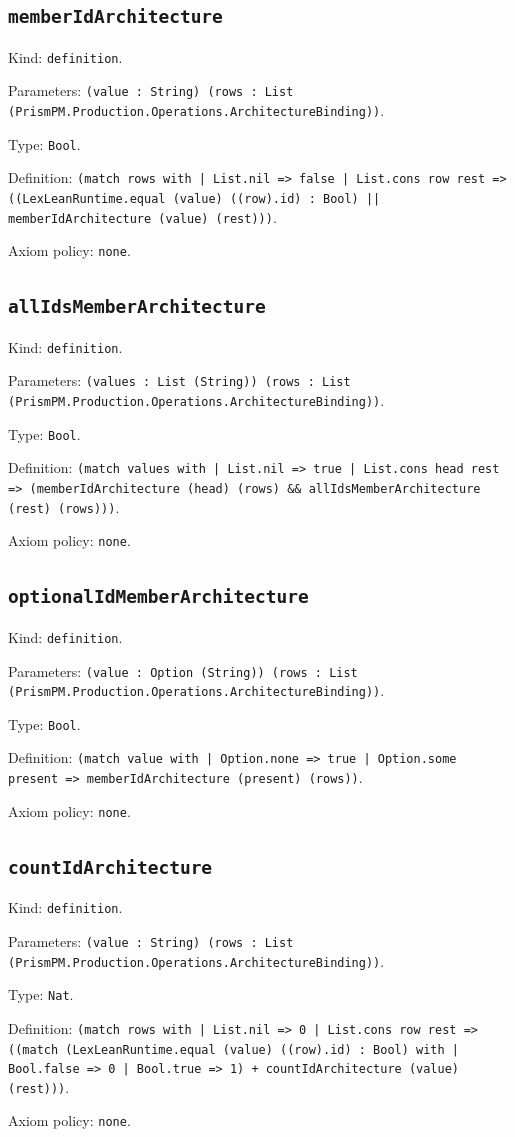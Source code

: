 \documentclass[11pt]{article}
\begin{document}
\subsection*{\texttt{memberIdArchitecture}}
\noindent Kind: \texttt{definition}.\par
\noindent Parameters: \texttt{(value : String) (rows : List (PrismPM.Production.Operations.ArchitectureBinding))}.\par
\noindent Type: \texttt{Bool}.\par
\noindent Definition: \texttt{(match rows with | List.nil => false | List.cons row rest => ((LexLeanRuntime.equal (value) ((row).id) : Bool) || memberIdArchitecture (value) (rest)))}.\par
\noindent Axiom policy: \texttt{none}.\par
\subsection*{\texttt{allIdsMemberArchitecture}}
\noindent Kind: \texttt{definition}.\par
\noindent Parameters: \texttt{(values : List (String)) (rows : List (PrismPM.Production.Operations.ArchitectureBinding))}.\par
\noindent Type: \texttt{Bool}.\par
\noindent Definition: \texttt{(match values with | List.nil => true | List.cons head rest => (memberIdArchitecture (head) (rows) \&\& allIdsMemberArchitecture (rest) (rows)))}.\par
\noindent Axiom policy: \texttt{none}.\par
\subsection*{\texttt{optionalIdMemberArchitecture}}
\noindent Kind: \texttt{definition}.\par
\noindent Parameters: \texttt{(value : Option (String)) (rows : List (PrismPM.Production.Operations.ArchitectureBinding))}.\par
\noindent Type: \texttt{Bool}.\par
\noindent Definition: \texttt{(match value with | Option.none => true | Option.some present => memberIdArchitecture (present) (rows))}.\par
\noindent Axiom policy: \texttt{none}.\par
\subsection*{\texttt{countIdArchitecture}}
\noindent Kind: \texttt{definition}.\par
\noindent Parameters: \texttt{(value : String) (rows : List (PrismPM.Production.Operations.ArchitectureBinding))}.\par
\noindent Type: \texttt{Nat}.\par
\noindent Definition: \texttt{(match rows with | List.nil => 0 | List.cons row rest => ((match (LexLeanRuntime.equal (value) ((row).id) : Bool) with | Bool.false => 0 | Bool.true => 1) + countIdArchitecture (value) (rest)))}.\par
\noindent Axiom policy: \texttt{none}.\par
\end{document}
